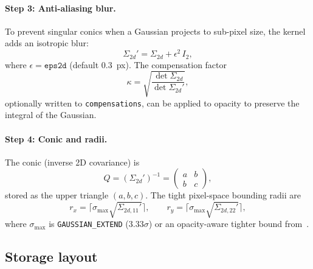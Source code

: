 \documentclass[11pt]{article}
\begin{document}
\paragraph{Step 3: Anti-aliasing blur.}
To prevent singular conics when a Gaussian projects to sub-pixel
size, the kernel adds an isotropic blur:
\begin{equation}
  \Sigma_{2d}' = \Sigma_{2d} + \epsilon^2\, I_2,
  \label{eq:blur}
\end{equation}
where $\epsilon = \texttt{eps2d}$ (default $0.3$~px). The
compensation factor
\begin{equation}
  \kappa = \sqrt{\frac{\det \Sigma_{2d}}{\det \Sigma_{2d}'}},
  \label{eq:compensation}
\end{equation}
optionally written to \texttt{compensations}, can be applied to
opacity to preserve the integral of the Gaussian.

\paragraph{Step 4: Conic and radii.}
The conic (inverse 2D covariance) is
\begin{equation}
  Q = (\Sigma_{2d}')^{-1} =
  \begin{pmatrix} a & b \\ b & c \end{pmatrix},
  \label{eq:conic}
\end{equation}
stored as the upper triangle $(a, b, c)$. The tight pixel-space
bounding radii are
\begin{equation}
  r_x = \lceil \sigma_{\max} \sqrt{\Sigma_{2d,11}'} \rceil,
  \qquad
  r_y = \lceil \sigma_{\max} \sqrt{\Sigma_{2d,22}'} \rceil,
  \label{eq:radii}
\end{equation}
where $\sigma_{\max}$ is \texttt{GAUSSIAN\_EXTEND} ($3.33\sigma$) or
an opacity-aware tighter bound from~\cite{ye2024absgs}.

\subsection{Storage layout}
\end{document}
